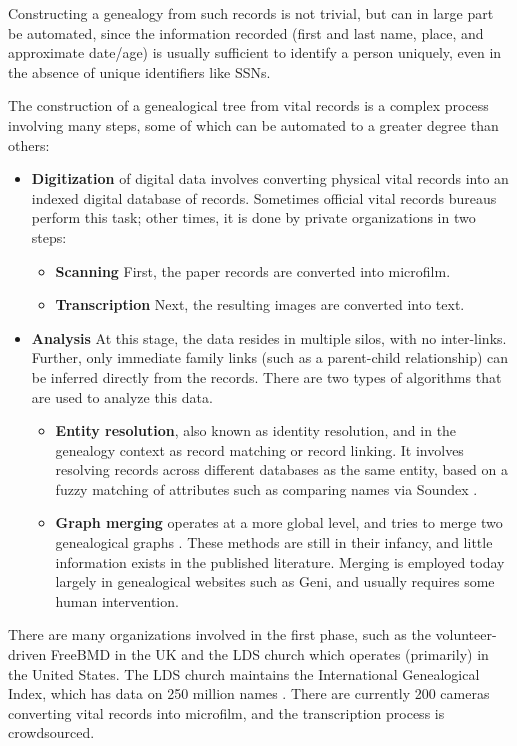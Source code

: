 \documentclass{article}
\begin{document}
Constructing a genealogy from such records is not trivial, but can in large part be automated, since the information recorded (first and last name, place, and approximate date/age) is usually sufficient to identify a person uniquely, even in the absence of unique identifiers like SSNs. 

The construction of a genealogical tree from vital records is a complex process involving many steps, some of which can be automated to a greater degree than others:
\begin{itemize}
\item {\bf Digitization} of digital data involves converting physical vital records into an indexed digital database of records. Sometimes official vital records bureaus perform this task; other times, it is done by private organizations in two steps:
\begin{itemize}
\item {\bf Scanning} First, the paper records are converted into microfilm.
\item {\bf Transcription} Next, the resulting images are converted into text.
\end{itemize}
\item {\bf Analysis} At this stage, the data resides in multiple silos, with no inter-links. Further, only immediate family links (such as a parent-child relationship) can be inferred directly from the records. There are two types of algorithms that are used to analyze this data.
\begin{itemize}
\item {\bf Entity resolution}, also known as identity resolution, and in the genealogy context as record matching or record linking. It involves resolving records across different databases as the same entity, based on a fuzzy matching of attributes such as comparing names via Soundex \cite{Lait_and_Randall_An_Assessment_of_Name_Matching_Algorithms}.
\item {\bf Graph merging} operates at a more global level, and tries to merge two genealogical graphs \cite{wilson-remerging}. These methods are still in their infancy, and little information exists in the published literature. Merging is employed today largely in genealogical websites such as Geni, and usually requires some human intervention.
\end{itemize}

\end{itemize}

 There are many organizations involved in the first phase, such as the volunteer-driven FreeBMD in the UK \cite{freebmd} and the LDS church which operates (primarily) in the United States. The LDS church maintains the International Genealogical Index, which has data on 250 million names \cite{familysearch}. There are currently 200 cameras converting vital records into microfilm, and the transcription process is crowdsourced. 
\end{document}
